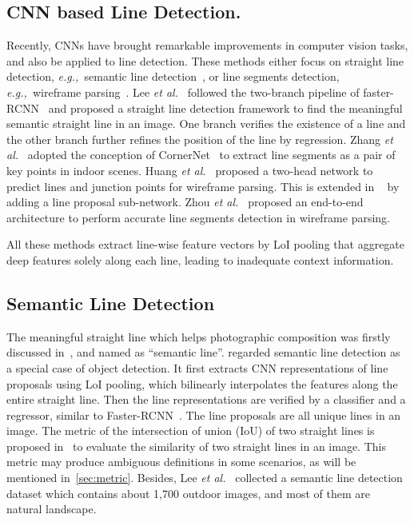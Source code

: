 \documentclass[10pt,journal,cspaper,compsoc]{IEEEtran}
\def\etal{\emph{et al.~}}
\def\eg{\emph{e.g.,~}}
\begin{document}
\subsection{CNN based Line Detection.}
Recently, CNNs have brought remarkable improvements in computer vision tasks, and also be applied to line detection.
These methods either focus on straight line detection, \eg semantic line detection~\cite{lee2017semantic,ahmad2017comparison}, or line segments detection, 
\eg wireframe parsing~\cite{zhang2019ppgnet,huang2018learning,zhou2019end,xue2020holistically}.
Lee \etal \cite{lee2017semantic} followed the two-branch pipeline of faster-RCNN~\cite{ren2015faster}
and proposed a straight line detection framework to find the meaningful semantic straight line in an image. 
One branch verifies the existence of a line and the other branch further refines the position of the line
by regression.
Zhang \etal \cite{zhang2019ppgnet} adopted the conception of CornerNet~\cite{law2018cornernet} 
to extract line segments as a pair of key points in indoor scenes.
Huang \etal \cite{huang2018learning} proposed a two-head network to predict lines and junction points for wireframe parsing.
This is extended in ~\cite{zhou2019end} by adding a line proposal sub-network.
Zhou \etal \cite{zhou2019end} proposed an end-to-end architecture to perform accurate line segments detection in wireframe parsing. 

All these methods extract line-wise feature vectors by LoI pooling that aggregate deep features solely along each line,
leading to inadequate context information.

\subsection{Semantic Line Detection}
The meaningful straight line which helps photographic composition was firstly discussed in~\cite{lee2017semantic},
and named as ``semantic line''.
\cite{lee2017semantic} regarded semantic line detection as a special case of object detection.
It first extracts CNN representations of line proposals using LoI pooling, which bilinearly interpolates the 
features along the entire straight line.
Then the line representations are verified by a classifier and a regressor, similar to Faster-RCNN~\cite{girshick2015fast}.
The line proposals are all unique lines in an image.
The metric of the intersection of union (IoU) of two straight lines is proposed in~\cite{lee2017semantic} to evaluate the similarity of two straight lines in an image.
This metric may produce ambiguous definitions in some scenarios, as will be mentioned in~\cref{sec:metric}.
Besides, Lee \etal \cite{lee2017semantic} collected a semantic line detection dataset which
contains about 1,700 outdoor images, and most of them are natural landscape.
\end{document}
